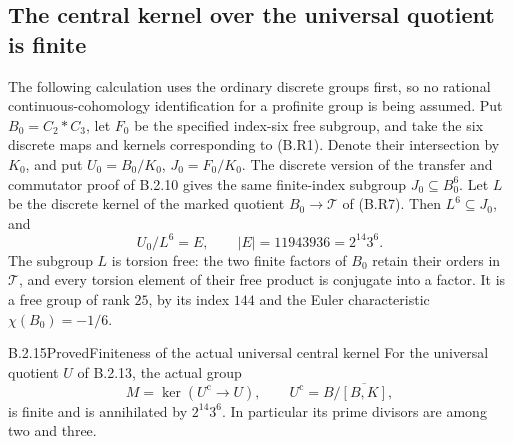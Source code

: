 \subsection{The central kernel over the universal quotient is finite}

The following calculation uses the ordinary discrete groups
first, so no rational continuous-cohomology identification
for a profinite group is being assumed.  Put
$B_0=C_2*C_3$, let $F_0$ be the specified index-six free
subgroup, and take the six discrete maps and kernels
corresponding to (B.R1).  Denote their intersection by
$K_0$, and put $U_0=B_0/K_0$, $J_0=F_0/K_0$.
The discrete version of the transfer and commutator proof
of B.2.10 gives the same finite-index subgroup
$J_0\subseteq B_0^6$.  Let $L$ be the discrete kernel of
the marked quotient $B_0\to\mathcal T$ of (B.R7).
Then $L^6\subseteq J_0$, and
\[
 U_0/L^6=E,\qquad |E|=11943936=2^{14}3^6.                       \tag{B.S4}
\]
The subgroup $L$ is torsion free: the two finite factors
of $B_0$ retain their orders in $\mathcal T$, and every
torsion element of their free product is conjugate into
a factor.  It is a free group of rank $25$, by its index
$144$ and the Euler characteristic $\chi(B_0)=-1/6$.

\begin{result}{B.2.15}{Proved}{Finiteness of the actual universal central kernel}
For the universal quotient $U$ of B.2.13, the actual group
\[
 M=\ker(U^{\mathrm c}\longrightarrow U),\qquad
 U^{\mathrm c}=B/\overline{[B,K]},                              \tag{B.S5}
\]
is finite and is annihilated by $2^{14}3^6$.  In particular
its prime divisors are among two and three.
\end{result}

